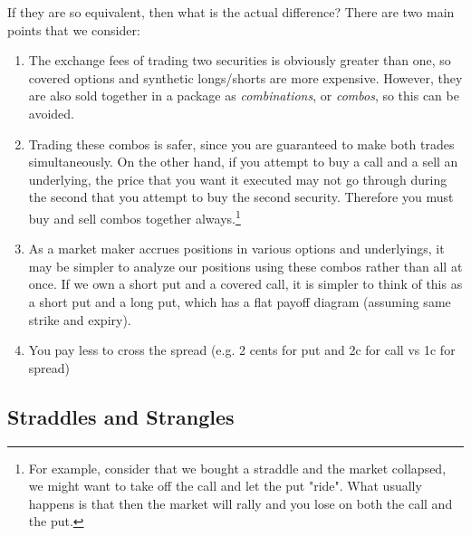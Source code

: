 \documentclass{article}
\begin{document}
    If they are so equivalent, then what is the actual difference? There are two main points that we consider: 
    \begin{enumerate}
      \item The exchange fees of trading two securities is obviously greater than one, so covered options and synthetic longs/shorts are more expensive. However, they are also sold together in a package as \textit{combinations}, or \textit{combos}, so this can be avoided. 

      \item Trading these combos is safer, since you are guaranteed to make both trades simultaneously. On the other hand, if you attempt to buy a call and a sell an underlying, the price that you want it executed may not go through during the second that you attempt to buy the second security. Therefore you must buy and sell combos together always.\footnote{For example, consider that we bought a straddle and the market collapsed, we might want to take off the call and let the put "ride". What usually happens is that then the market will rally and you lose on both the call and the put. }

      \item As a market maker accrues positions in various options and underlyings, it may be simpler to analyze our positions using these combos rather than all at once. If we own a short put and a covered call, it is simpler to think of this as a short put and a long put, which has a flat payoff diagram (assuming same strike and expiry). 

      \item You pay less to cross the spread (e.g. 2 cents for put and 2c for call vs 1c for spread) 
    \end{enumerate}

  \subsection{Straddles and Strangles}
\end{document}
